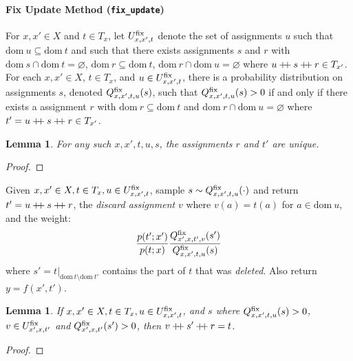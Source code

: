 \documentclass{article}
\newtheorem{lemma}[theorem]{Lemma}
\newcommand{\code}[1]{\texttt{\small{\textbf{#1}}}}
\newcommand\doubleplus{\mathbin{+\mkern-5mu+}}
\newcommand{\concat}[0]{\doubleplus}
\newcommand{\dom}[1]{\mbox{dom}{~#1}}
\newcommand{\fix}[0]{\mbox{\scriptsize fix}}
\begin{document}

\paragraph{Fix Update Method (\code{fix\_update})}
For $x, x' \in X$ and $t \in T_x$, let $U^{\fix}_{x,x',t}$ denote the set of assignments $u$ such that $\dom{u} \subseteq \dom{t}$ and such that there exists assignments $s$ and $r$ with $\dom{s} \cap \dom{t} = \varnothing$, $\dom{r} \subseteq \dom{t}$, $\dom{r} \cap \dom{u} = \varnothing$ where $u \concat s \concat r \in T_{x'}$.
For each $x, x' \in X$, $t \in T_x$, and $u \in U^{\fix}_{x,x',t}$, there is a probability distribution on assignments $s$, denoted $Q^{\fix}_{x,x',t,u}(s)$, such that $Q^{\fix}_{x,x',t,u}(s) > 0$ if and only if there exists a assignment $r$ with $\dom{r} \subseteq \dom{t}$ and $\dom{r} \cap \dom{u} = \varnothing$ where $t' = u \concat s \concat r \in T_{x'}$.

\begin{lemma} \label{lemma:fix-update-unique}
For any such $x, x', t, u, s$, the assignments $r$ and $t'$ are unique.
\end{lemma}
\begin{proof}
\end{proof}

Given $x, x' \in X, t \in T_x, u \in U^{\fix}_{x,x',t}$, sample $s \sim Q^{\fix}_{x,x',t,u}(\cdot)$ and return $t' = u \concat s \concat r$, the \emph{discard assignment} $v$ where $v(a) = t(a)$ for $a \in \dom{u}$, and the weight:
\[
\frac{p(t'; x')}{p(t; x)} \frac{Q^{\fix}_{x',x,t',v}(s')}{Q^{\fix}_{x,x',t,u}(s)}
\]
where $s' = t|_{\dom{t} \setminus \dom{t'}}$ contains the part of $t$ that was \emph{deleted}.
Also return $y = f(x', t')$.

\begin{lemma} \label{lemma:fix-update-reverse}
If $x, x' \in X, t \in T_x, u \in U^{\fix}_{x, x', t}$, and $s$ where $Q^{\fix}_{x,x',t,u}(s) > 0$, $v \in U^{\fix}_{x',x,t'}$ and $Q^{\fix}_{x',x,t'}(s') > 0$, then $v \concat s' \concat r = t$.
\end{lemma}
\begin{proof}
\end{proof}
\end{document}
